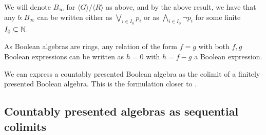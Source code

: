 \begin{remark}
  We will denote $B_\infty$ for $\langle G \rangle/ \langle R\rangle $ as above, 
  and by the above result, we have that any $b:B_\infty$ can be written 
  either as $\bigvee_{i\in I_0} p_i$ or as $\bigwedge_{i\in I_0} \neg p_i$ for some finite $I_0\subseteq \mathbb{N}$. 
\end{remark}


\begin{remark}
  As Boolean algebras are rings, any relation of the form $f=g$ with both $f,g$ Boolean expressions 
  can be written as $h=0$ with $h=f-g$ a Boolean expression. 
\end{remark} 
We can express a countably presented Boolean algebra as the colimit of a finitely presented Boolean algebra. 
This is the formulation closer to \cite{Scholze}.

\subsection{Countably presented algebras as sequential colimits}

